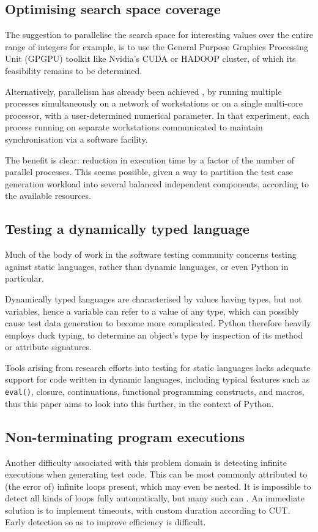\documentclass{icldt}
\numberwithin{equation}{section}       %
\begin{document}
{\subsection{Optimising search space coverage}
The suggestion to parallelise the search space for interesting values over the entire range of integers for example, is to use the General Purpose Graphics Processing Unit (GPGPU) toolkit like Nvidia's CUDA or HADOOP cluster, of which its feasibility remains to be determined.

Alternatively, parallelism has already been achieved \cite{Pargas99}, by running multiple processes simultaneously on a network of workstations or on a single multi-core processor, with a user-determined numerical parameter. In that experiment, each process running on separate workstations communicated to maintain synchronisation via a software facility.

The benefit is clear: reduction in execution time by a factor of the number of parallel processes. This seems possible, given a way to partition the test case generation workload into several balanced independent components, according to the available resources.
\subsection{Testing a dynamically typed language}
Much of the body of work in the software testing community concerns testing against static languages, rather than dynamic languages, or even Python in particular.

Dynamically typed languages are characterised by values having types, but not variables, hence a variable can refer to a value of any type, which can possibly cause test data generation to become more complicated. Python therefore heavily employs duck typing, to determine an object's type by inspection of its method or attribute signatures.

Tools arising from research efforts into testing for static languages lacks adequate support for code written in dynamic languages, including typical features such as \texttt{eval()}, closure, continuations, functional programming constructs, and macros, thus this paper aims to look into this further, in the context of Python.
\subsection{Non-terminating program executions}
Another difficulty associated with this problem domain is detecting infinite executions when generating test code. This can be most commonly attributed to (the error of) infinite loops present, which may even be nested. It is impossible to detect all kinds of loops fully automatically, but many such can \cite{Tahbildar}. An immediate solution is to implement timeouts, with custom duration according to CUT. Early detection so as to improve efficiency is difficult.
}
\end{document}
